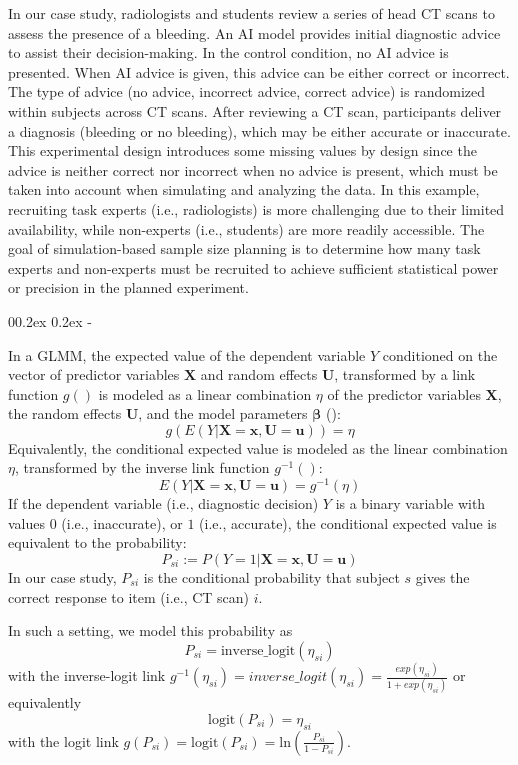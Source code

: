 \documentclass[
  man,
  floatsintext,
  longtable,
  a4paper,
  nolmodern,
  notxfonts,
  notimes,
  colorlinks=true,linkcolor=blue,citecolor=blue,urlcolor=blue]{apa7}
\makeatletter
\renewcommand{\subparagraph}[1]{\@startsection{subparagraph}{5}{0.5em}%
	{0\baselineskip \@plus 0.2ex \@minus 0.2ex}%
	{-\z@\relax}%
	{\normalfont\normalsize\bfseries\itshape\hspace{\parindent}{#1}\textit{\addperi}}{\relax}}
\makeatother
\begin{document}
In our case study, radiologists and students review a series of head CT
scans to assess the presence of a bleeding. An AI model provides initial
diagnostic advice to assist their decision-making. In the control
condition, no AI advice is presented. When AI advice is given, this
advice can be either correct or incorrect. The type of advice (no
advice, incorrect advice, correct advice) is randomized within subjects
across CT scans. After reviewing a CT scan, participants deliver a
diagnosis (bleeding or no bleeding), which may be either accurate or
inaccurate. This experimental design introduces some missing values by
design since the advice is neither correct nor incorrect when no advice
is present, which must be taken into account when simulating and
analyzing the data. In this example, recruiting task experts (i.e.,
radiologists) is more challenging due to their limited availability,
while non-experts (i.e., students) are more readily accessible. The goal
of simulation-based sample size planning is to determine how many task
experts and non-experts must be recruited to achieve sufficient
statistical power or precision in the planned experiment.

\subparagraph{Our specific GLMM.}\label{our-specific-glmm}

In a GLMM, the expected value of the dependent variable \(Y\)
conditioned on the vector of predictor variables \(\mathbf{X}\) and
random effects \(\mathbf{U}\), transformed by a link function \(g()\) is
modeled as a linear combination \(\eta\) of the predictor variables
\(\mathbf{X}\), the random effects \(\mathbf{U}\), and the model
parameters \(\mathbf{\beta}\)
(): \[
g(E(Y|\mathbf{X}=\mathbf{x},\mathbf{U}=\mathbf{u})) = \eta
\] Equivalently, the conditional expected value is modeled as the linear
combination \(\eta\), transformed by the inverse link function
\(g^{-1}()\): \[
E(Y|\mathbf{X}=\mathbf{x},\mathbf{U}=\mathbf{u}) = g^{-1}(\eta)
\] If the dependent variable (i.e., diagnostic decision) \(Y\) is a
binary variable with values \(0\) (i.e., inaccurate), or \(1\) (i.e.,
accurate), the conditional expected value is equivalent to the
probability: \[
P_{si} := P(Y = 1|\mathbf{X}=\mathbf{x},\mathbf{U}=\mathbf{u})
\] In our case study, \(P_{si}\) is the conditional probability that
subject \(s\) gives the correct response to item (i.e., CT scan) \(i\).

In such a setting, we model this probability as \[
P_{si} = \text{inverse\_logit}(\eta_{si})
\] with the inverse-logit link
\(g^{-1}(\eta_{si}) = inverse\_logit(\eta_{si}) = \frac{exp(\eta_{si})}{1 + exp(\eta_{si})}\)
or equivalently \[
\text{logit}(P_{si}) = \eta_{si}
\] with the logit link
\(g(P_{si}) = \text{logit}(P_{si}) = \text{ln} (\frac{P_{si}}{1 - P_{si}})\).
\end{document}

